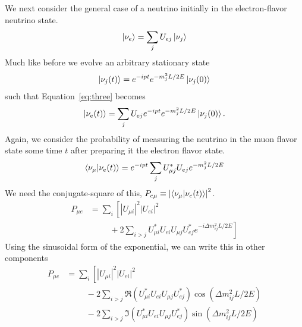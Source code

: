 \documentclass[main.tex]{subfiles}
\begin{document}
We next consider the general case of a neutrino initially in the electron-flavor neutrino state. 
\begin{equation}\label{eq:three}
    \left| \nu_{e} \right > =\sum\limits_{j} U_{ej} \left| \nu_{j} \right > 
\end{equation}
Much like before we evolve an arbitrary stationary state
\begin{equation}
    \left| \nu_{j} (t) \right >  = e^{-ipt}e^{ -m_{j}^{2}L/2E}\left| \nu_{j} (0) \right >
\end{equation}
such that Equation~\eqref{eq:three} becomes
\begin{equation}
    \left| \nu_{e}(t) \right > = \sum\limits_{j} U_{ej} e^{-ipt}e^{ -m_{j}^{2}L/2E}\left| \nu_{j} (0) \right >.
\end{equation}
Again, we consider the probability of measuring the neutrino in the muon flavor state some time $t$ after preparing it the electron flavor state. 
\begin{equation}
    \left< \nu_{\mu} | \nu_{e}(t) \right> = e^{-ipt} \sum\limits_{j} U_{\mu j}^{*}U_{ej} e^{ -m_{j}^{2}L/2E}
\end{equation}
We need the conjugate-square of this, $P_{e\mu} \equiv \left|\left< \nu_{\mu}|\nu_{e}(t) \right>\right|^{2}$.
\begin{equation}\begin{split}
P_{\mu e}&= \sum\limits_{i}\left[\left|U_{\mu i}\right|^{2}\left|U_{e i}\right|^{2} \right.\\
&\hspace{1cm} + 2\sum\limits_{i>j}U_{\mu i}^{*}U_{e i}U_{\mu j}U_{e j}^{*}\left.e^{-i\Delta m_{ij}^{2}L/2E} \right]
\end{split}\end{equation} 
Using the sinusoidal form of the exponential, we can write this in other components 
\begin{equation}\begin{split}
    P_{\mu e}&= \sum\limits_{i}\left[\left|U_{\mu i}\right|^{2}\left|U_{e i}\right|^{2} \right.\\
    &\hspace{1cm} -2\sum\limits_{i>j} \Re(U_{\mu i}^{*}U_{e i}U_{\mu j}U_{e j}^{*})\cos\left(\Delta m_{ij}^{2}L/2E \right) \\
    &\hspace{1cm} -2\sum\limits_{i>j}\Im(U_{\mu i}^{*}U_{e i}U_{\mu j}U_{e j}^{*})\sin\left(\Delta m_{ij}^{2}L/2E \right)
\end{split}\end{equation} 

\iffalse
\end{document}
